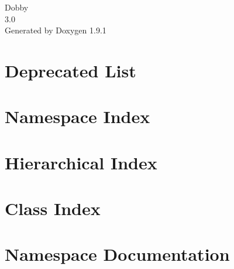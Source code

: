 \let\mypdfximage\pdfximage\def\pdfximage{\immediate\mypdfximage}\documentclass[twoside]{book}
\newcommand{\+}{\discretionary{\mbox{\scriptsize$\hookleftarrow$}}{}{}}
\newcommand{\clearemptydoublepage}{%
  \newpage{\pagestyle{empty}\cleardoublepage}%
}
\begin{document}
\raggedbottom

\hypersetup{pageanchor=false,
             bookmarksnumbered=true,
             pdfencoding=unicode
            }
\begin{titlepage}
\vspace*{7cm}
\begin{center}%
{\Large Dobby \\[1ex]\large 3.\+0 }\\
\vspace*{1cm}
{\large Generated by Doxygen 1.9.1}\\
\end{center}
\end{titlepage}
\clearemptydoublepage
{}
\tableofcontents
\clearemptydoublepage
{}
\hypersetup{pageanchor=true}

\chapter{Deprecated List}
\label{deprecated}

\chapter{Namespace Index}

\chapter{Hierarchical Index}

\chapter{Class Index}

\chapter{Namespace Documentation}







\end{document}
